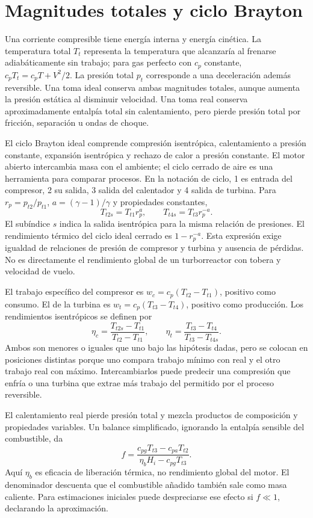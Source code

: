 \section{Magnitudes totales y ciclo Brayton}
Una corriente compresible tiene energía interna y energía cinética. La temperatura total $T_t$ representa la temperatura que alcanzaría al frenarse adiabáticamente sin trabajo; para gas perfecto con $c_p$ constante, $c_pT_t=c_pT+V^2/2$. La presión total $p_t$ corresponde a una deceleración además reversible. Una toma ideal conserva ambas magnitudes totales, aunque aumenta la presión estática al disminuir velocidad. Una toma real conserva aproximadamente entalpía total sin calentamiento, pero pierde presión total por fricción, separación u ondas de choque.

El ciclo Brayton ideal comprende compresión isentrópica, calentamiento a presión constante, expansión isentrópica y rechazo de calor a presión constante. El motor abierto intercambia masa con el ambiente; el ciclo cerrado de aire es una herramienta para comparar procesos. En la notación de ciclo, 1 es entrada del compresor, 2 su salida, 3 salida del calentador y 4 salida de turbina. Para $r_p=p_{t2}/p_{t1}$, $a=(\gamma-1)/\gamma$ y propiedades constantes,
\begin{equation}
 T_{t2s}=T_{t1}r_p^a,\qquad
 T_{t4s}=T_{t3}r_p^{-a}.
\end{equation}
El subíndice $s$ indica la salida isentrópica para la misma relación de presiones. El rendimiento térmico del ciclo ideal cerrado es $1-r_p^{-a}$. Esta expresión exige igualdad de relaciones de presión de compresor y turbina y ausencia de pérdidas. No es directamente el rendimiento global de un turborreactor con tobera y velocidad de vuelo.

El trabajo específico del compresor es $w_c=c_p(T_{t2}-T_{t1})$, positivo como consumo. El de la turbina es $w_t=c_p(T_{t3}-T_{t4})$, positivo como producción. Los rendimientos isentrópicos se definen por
\begin{equation}
 \eta_c=\frac{T_{t2s}-T_{t1}}{T_{t2}-T_{t1}},\qquad
 \eta_t=\frac{T_{t3}-T_{t4}}{T_{t3}-T_{t4s}}.
\end{equation}
Ambos son menores o iguales que uno bajo las hipótesis dadas, pero se colocan en posiciones distintas porque uno compara trabajo mínimo con real y el otro trabajo real con máximo. Intercambiarlos puede predecir una compresión que enfría o una turbina que extrae más trabajo del permitido por el proceso reversible.

El calentamiento real pierde presión total y mezcla productos de composición y propiedades variables. Un balance simplificado, ignorando la entalpía sensible del combustible, da
\begin{equation}
 f=\frac{c_{pg}T_{t3}-c_{pa}T_{t2}}
 {\eta_b H_i-c_{pg}T_{t3}}.
\end{equation}
Aquí $\eta_b$ es eficacia de liberación térmica, no rendimiento global del motor. El denominador descuenta que el combustible añadido también sale como masa caliente. Para estimaciones iniciales puede despreciarse ese efecto si $f\ll1$, declarando la aproximación.

